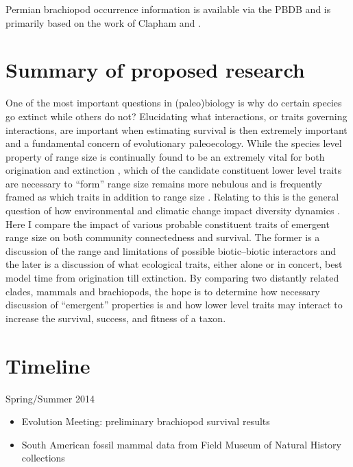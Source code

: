 \documentclass[12pt,letterpaper]{article}
\begin{document}
Permian brachiopod occurrence information is available via the PBDB and is primarily based on the work of Clapham \citep{Clapham2006,Clapham2008a,Clapham2007a,Clapham2012,Clapham2007} and \citet{Waterhouse1987}.


\section{Summary of proposed research}
One of the most important questions in (paleo)biology is why do certain species go extinct while others do not? %
Elucidating what interactions, or traits governing interactions, are important when estimating survival is then extremely important and a fundamental concern of evolutionary paleoecology. While the species level property of range size is continually found to be an extremely vital for both origination and extinction \citep{Roy2009c,Foote2013,Jablonski2003,Jablonski1987,Harnik2013}, which of the candidate constituent lower level traits are necessary to ``form'' range size remains more nebulous and is frequently framed as which traits in addition to range size \citep{Foote2013,Harnik2011,Nurnberg2013a}. Relating to this is the general question of how environmental and climatic change impact diversity dynamics \citep{Barnosky2001a,Alroy2000g,Figueirido2012,Olszewski2004}.
Here I compare the impact of various probable constituent traits of emergent range size on both community connectedness and survival. The former is a discussion of the range and limitations of possible biotic--biotic interactors and the later is a discussion of what ecological traits, either alone or in concert, best model time from origination till extinction. By comparing two distantly related clades, mammals and brachiopods, the hope is to determine how necessary discussion of ``emergent'' properties is and how lower level traits may interact to increase the survival, success, and fitness of a taxon.


\clearpage
\section{Timeline}

Spring/Summer 2014
\begin{itemize}
  \item Evolution Meeting: preliminary brachiopod survival results
  \item South American fossil mammal data from Field Museum of Natural History collections
\end{itemize}
\end{document}
